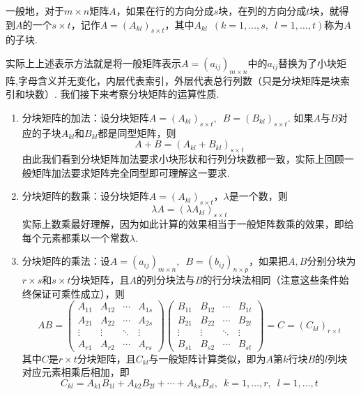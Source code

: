\begin{definition}{}{}
    一般地，对于$m \times n$矩阵$A$，如果在行的方向分成$s$块，在列的方向分成$t$块，就得到$A$的一个$s \times t$，记作$A=(A_{kl})_{s \times t}$，其中$A_{kl}\enspace(k=1,\ldots,s,\enspace l=1,\ldots,t)$称为$A$的子块.
\end{definition}
实际上上述表示方法就是将一般矩阵表示$A=(a_{ij})_{m \times n}$中的$a_{ij}$替换为了小块矩阵,字母含义并无变化，内层代表索引，外层代表总行列数（只是分块矩阵是块索引和块数）. 我们接下来考察分块矩阵的运算性质.
\begin{enumerate}
    \item 分块矩阵的加法：设分块矩阵$A=(A_{kl})_{s \times t},\enspace B=(B_{kl})_{s \times t}$. 如果$A$与$B$对应的子块$A_{kl}$和$B_{kl}$都是同型矩阵，则
          \[A+B=(A_{kl}+B_{kl})_{s \times t}\]
          由此我们看到分块矩阵加法要求小块形状和行列分块数都一致，实际上回顾一般矩阵加法要求矩阵完全同型即可理解这一要求.

    \item 分块矩阵的数乘：设分块矩阵$A=(A_{kl})_{s \times t}$，$\lambda$是一个数，则
          \[\lambda A=(\lambda A_{kl})_{s \times t}\]
          实际上数乘最好理解，因为如此计算的效果相当于一般矩阵数乘的效果，即给每个元素都乘以一个常数$\lambda$.

    \item 分块矩阵的乘法：设$A=(a_{ij})_{m \times n},\enspace B=(b_{ij})_{n \times p}$，如果把$A,B$分别分块为$r \times s$和$s \times t$分块矩阵，且$A$的列分块法与$B$的行分块法相同（注意这些条件始终保证可乘性成立），则
          \[AB=\begin{pmatrix}
                  A_{11} & A_{12} & \cdots & A_{1s} \\
                  A_{21} & A_{22} & \cdots & A_{2s} \\
                  \vdots & \vdots & \ddots & \vdots \\
                  A_{r1} & A_{r2} & \cdots & A_{rs}
              \end{pmatrix}\begin{pmatrix}
                  B_{11} & B_{12} & \cdots & B_{1t} \\
                  B_{21} & B_{22} & \cdots & B_{2t} \\
                  \vdots & \vdots & \ddots & \vdots \\
                  B_{s1} & B_{s2} & \cdots & B_{st}
              \end{pmatrix}=C=(C_{kl})_{r \times t}\]
          其中$C$是$r \times t$分块矩阵，且$C_{kl}$与一般矩阵计算类似，即为$A$第$k$行块$B$的$l$列块对应元素相乘后相加，即
          \[C_{kl}=A_{k1}B_{1l}+A_{k2}B_{2l}+\cdots+A_{ks}B_{sl},\enspace k=1,\ldots,r,\enspace l=1,\ldots,t\]


\end{enumerate}
